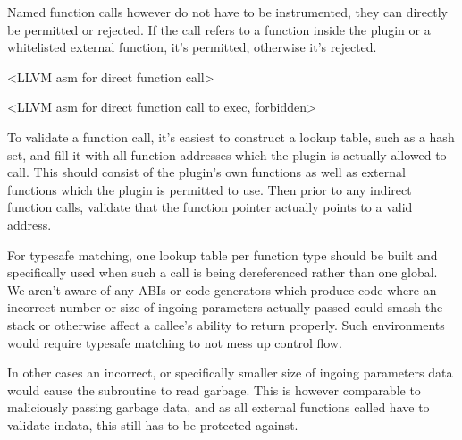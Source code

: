 Named function calls however do not have to be instrumented, they can directly
be permitted or rejected. If the call refers to a function inside the plugin or
a whitelisted external function, it's permitted, otherwise it's rejected.

<LLVM asm for direct function call>

<LLVM asm for direct function call to exec, forbidden>

To validate a function call, it's easiest to construct a lookup table, such as a
hash set, and fill it with all function addresses which the plugin is actually
allowed to call. This should consist of the plugin's own functions as well as
external functions which the plugin is permitted to use. Then prior to any
indirect function calls, validate that the function pointer actually points to a
valid address.

For typesafe matching, one lookup table per function type should be built and
specifically used when such a call is being dereferenced rather than one global.
We aren't aware of any ABIs or code generators which produce code where an
incorrect number or size of ingoing parameters actually passed could smash the
stack or otherwise affect a callee's ability to return properly. Such
environments would require typesafe matching to not mess up control flow.

In other cases an incorrect, or specifically smaller size of ingoing parameters
data would cause the subroutine to read garbage. This is however comparable to
maliciously passing garbage data, and as all external functions called have to
validate indata, this still has to be protected against.
